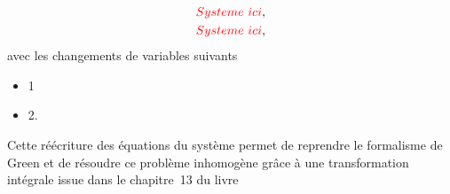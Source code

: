 \begin{subequations}
	\begin{align}
		\textcolor{red}{Systeme\ ici},\label{eq:1_LottonPoignand}\\
		\textcolor{red}{Systeme\ ici},\label{eq:2_LottonPoignand}
	\end{align}
	\label{eq:SystemeEq_LottonPoignand}
\end{subequations}
avec les changements de variables suivants

\begin{itemize} \color{red}
	\item 1
	\item 2.
\end{itemize}

Cette réécriture des équations du système permet de reprendre le formalisme de Green et de résoudre ce problème inhomogène grâce à une transformation intégrale issue dans le chapitre~13 du livre \cite{ozisik_heat_1993, ozisik_integraltransform_heat_1993}






